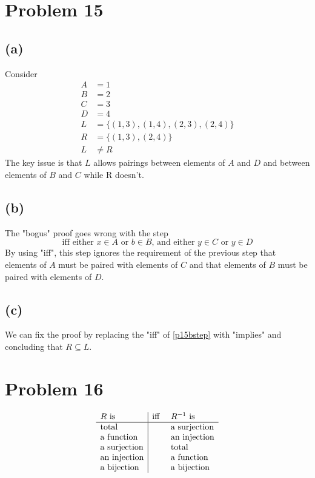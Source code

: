 \documentclass{article}
\begin{document}
\pagebreak

\section{Problem 15}
\subsection{(a)}
Consider
\begin{align*}
	A & = {1}                         \\
	B & = {2}                         \\
	C & = {3}                         \\
	D & = {4}                         \\
	L & = \{(1,3),(1,4),(2,3),(2,4)\} \\
	R & = \{(1,3),(2,4)\}             \\
	L & \ne R
\end{align*}
The key issue is that $L$ allows pairings between elements of $A$ and $D$ and between elements of $B$ and $C$ while R doesn't.

\subsection{(b)}
The "bogus" proof goes wrong with the step
\begin{equation}\label{p15bstep}
	\text{iff either } x \in A \text{ or } b \in B \text{, and either } y \in C \text{ or } y \in D
\end{equation}
By using "iff", this step ignores the requirement of the previous step that elements of $A$ must be paired with elements of $C$ and that elements of $B$ must be paired with elements of $D$.

\subsection{(c)}
We can fix the proof by replacing the "iff" of \eqref{p15bstep} with "implies" and concluding that $R \subseteq L$.

\pagebreak

\section{Problem 16}
\[
	\begin{array}{l|l l}
		R \text{ is}        & \text{iff } & R^{-1} \text{ is}   \\
		\hline
		\text{total}        &             & \text{a surjection} \\
		\text{a function}   &             & \text{an injection} \\
		\text{a surjection} &             & \text{total}        \\
		\text{an injection} &             & \text{a function}   \\
		\text{a bijection}  &             & \text{a bijection}
	\end{array}
\]
\pagebreak
\end{document}
